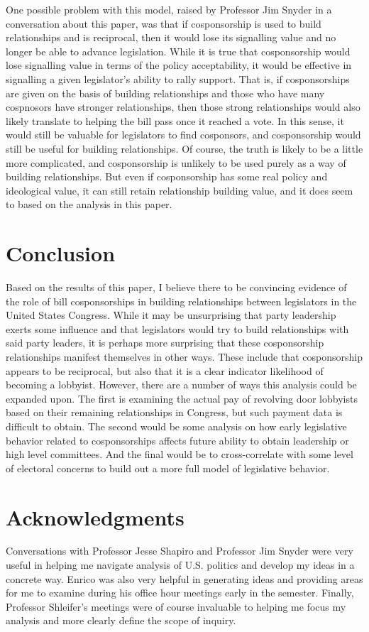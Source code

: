 \documentclass{article}
\begin{document}
  One possible problem with this model, raised by Professor Jim Snyder in a conversation about this paper, was that if cosponsorship is used to build relationships and is reciprocal, then it would lose its signalling value and no longer be able to advance legislation. While it is true that cosponsorship would lose signalling value in terms of the policy acceptability, it would be effective in signalling a given legislator's ability to rally support. That is, if cosponsorships are given on the basis of building relationships and those who have many cospnosors have stronger relationships, then those strong relationships would also likely translate to helping the bill pass once it reached a vote. In this sense, it would still be valuable for legislators to find cosponsors, and cosponsorship would still be useful for building relationships. Of course, the truth is likely to be a little more complicated, and cosponsorship is unlikely to be used purely as a way of building relationships. But even if cosponsorship has some real policy and ideological value, it can still retain relationship building value, and it does seem to based on the analysis in this paper.


  \section{Conclusion}
  Based on the results of this paper, I believe there to be convincing evidence of the role of bill cosponsorships in building relationships between legislators in the United States Congress. While it may be unsurprising that party leadership exerts some influence and that legislators would try to build relationships with said party leaders, it is perhaps more surprising that these cosponsorship relationships manifest themselves in other ways. These include that cosponsorship appears to be reciprocal, but also that it is a clear indicator likelihood of becoming a lobbyist. However, there are a number of ways this analysis could be expanded upon. The first is examining the actual pay of revolving door lobbyists based on their remaining relationships in Congress, but such payment data is difficult to obtain. The second would be some analysis on how early legislative behavior related to cosponsorships affects future ability to obtain leadership or high level committees. And the final would be to cross-correlate with some level of electoral concerns to build out a more full model of legislative behavior.

  \section{Acknowledgments}
  Conversations with Professor Jesse Shapiro and Professor Jim Snyder were very useful in helping me navigate analysis of U.S. politics and develop my ideas in a concrete way. Enrico was also very helpful in generating ideas and providing areas for me to examine during his office hour meetings early in the semester. Finally, Professor Shleifer's meetings were of course invaluable to helping me focus my analysis and more clearly define the scope of inquiry. 

\pagebreak
\printbibliography
\end{document}
